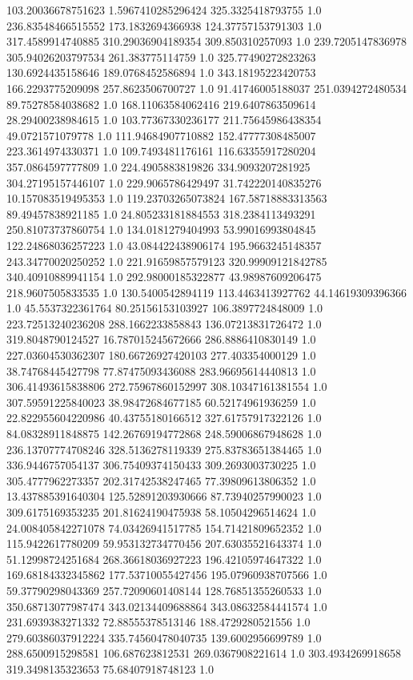103.20036678751623	1.5967410285296424	325.3325418793755	1.0
236.83548466515552	173.1832694366938	124.37757153791303	1.0
317.4589914740885	310.29036904189354	309.850310257093	1.0
239.7205147836978	305.94026203797534	261.383775114759	1.0
325.77490272823263	130.6924435158646	189.0768452586894	1.0
343.18195223420753	166.2293775209098	257.8623506700727	1.0
91.41746005188037	251.0394272480534	89.75278584038682	1.0
168.11063584062416	219.6407863509614	28.29400238984615	1.0
103.77367330236177	211.75645986438354	49.0721571079778	1.0
111.94684907710882	152.47777308485007	223.3614974330371	1.0
109.7493481176161	116.63355917280204	357.0864597777809	1.0
224.4905883819826	334.9093207281925	304.27195157446107	1.0
229.9065786429497	31.742220140835276	10.157083519495353	1.0
119.23703265073824	167.58718883313563	89.49457838921185	1.0
24.805233181884553	318.2384113493291	250.81073737860754	1.0
134.0181279404993	53.99016993804845	122.24868036257223	1.0
43.084422438906174	195.9663245148357	243.34770020250252	1.0
221.91659857579123	320.99909121842785	340.40910889941154	1.0
292.98000185322877	43.98987609206475	218.9607505833535	1.0
130.5400542894119	113.4463413927762	44.14619309396366	1.0
45.5537322361764	80.25156153103927	106.3897724848009	1.0
223.72513240236208	288.1662233858843	136.07213831726472	1.0
319.8048790124527	16.787015245672666	286.8886410830149	1.0
227.03604530362307	180.66726927420103	277.403354000129	1.0
38.74768445427798	77.87475093436088	283.96695614440813	1.0
306.41493615838806	272.75967860152997	308.10347161381554	1.0
307.59591225840023	38.98472684677185	60.52174961936259	1.0
22.822955604220986	40.43755180166512	327.61757917322126	1.0
84.08328911848875	142.26769194772868	248.59006867948628	1.0
236.13707774708246	328.5136278119339	275.83783651384465	1.0
336.9446757054137	306.75409374150433	309.2693003730225	1.0
305.4777962273357	202.31742538247465	77.39809613806352	1.0
13.437885391640304	125.52891203930666	87.73940257990023	1.0
309.6175169353235	201.81624190475938	58.10504296514624	1.0
24.008405842271078	74.03426941517785	154.71421809652352	1.0
115.9422617780209	59.953132734770456	207.63035521643374	1.0
51.12998724251684	268.36618036927223	196.42105974647322	1.0
169.68184332345862	177.53710055427456	195.07960938707566	1.0
59.37790298043369	257.72090601408144	128.76851355260533	1.0
350.68713077987474	343.02134409688864	343.08632584441574	1.0
231.6939383271332	72.88555378513146	188.4729280521556	1.0
279.60386037912224	335.74560478040735	139.6002956699789	1.0
288.6500915298581	106.687623812531	269.0367908221614	1.0
303.4934269918658	319.3498135323653	75.68407918748123	1.0

